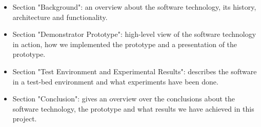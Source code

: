 \begin{itemize}
\item Section "Background": an overview about the software technology, its history, architecture and functionality. 

\item Section "Demonstrator Prototype": high-level view of the software technology in action, how we implemented the prototype and a presentation of the prototype.

\item Section "Test Environment and Experimental Results": describes the software in a test-bed environment and what experiments have been done.

\item Section "Conclusion": gives an overview over the conclusions about the software technology, the prototype and what results we have achieved in this project.
\end{itemize}